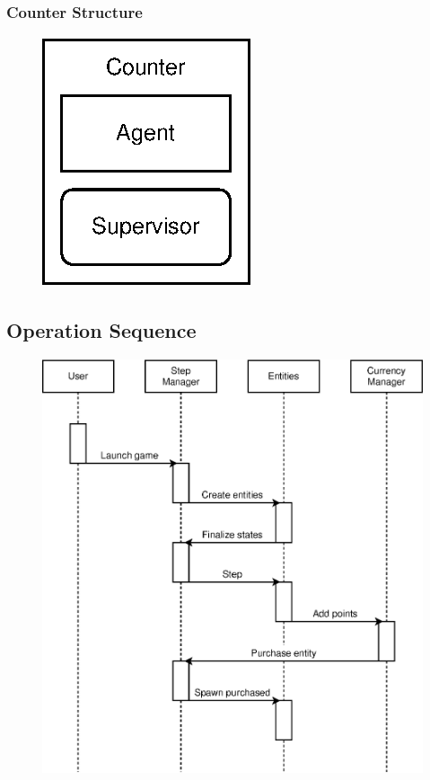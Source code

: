 \documentclass{article}
\begin{document}
\subsubsection{Counter Structure}
\begin{figure}[ht]
\centering
\includegraphics{h_counter.eps}
\end{figure}

\subsection{Operation Sequence}
\begin{figure}[ht]
\centering
\includegraphics[scale=0.97]{s_operation.eps}
\end{figure}
\end{document}
